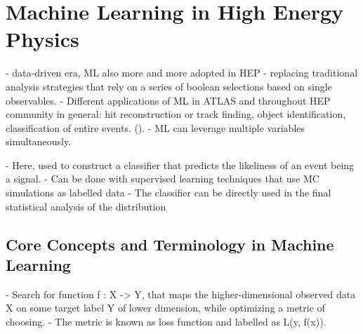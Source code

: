 




 
\chapter{Machine Learning in High Energy Physics}
\label{chap:ml}

- data-driven era, ML also more and more adopted in HEP
- replacing traditional analysis strategies that rely on a series of boolean selections based on single observables.
- Different applications of ML in ATLAS and throughout HEP community in general: hit reconstruction  or track finding, object identification, classification of entire events. ().
- ML can leverage multiple variables simultaneously.

- Here, used to construct a classifier that predicts the likeliness of an event being a signal. 
- Can be done with supervised learning techniques that use MC simulations as labelled data
- The classifier can be directly used in the final statistical analysis of the distribution



\section{Core Concepts and Terminology in Machine Learning}
- Search for function f : X -> Y, that maps the higher-dimensional observed data X on some target label Y of lower dimension, while optimizing a metric of choosing. 
- The metric is known as loss function and labelled as L(y, f(x)). 

